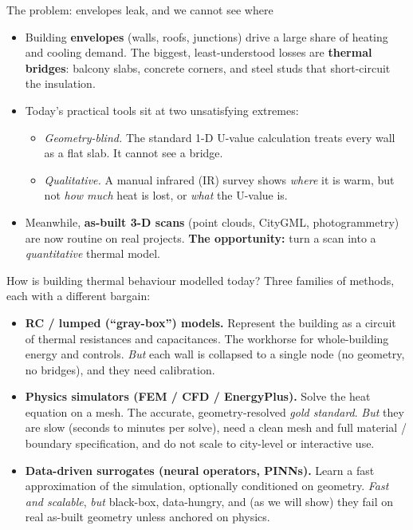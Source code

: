 \documentclass[aspectratio=169]{beamer}
\newcommand{\bad}[1]{{\color{red!65!black}#1}}
\begin{document}
\begin{frame}{The problem: envelopes leak, and we cannot see where}
  \begin{itemize}
    \item Building \textbf{envelopes} (walls, roofs, junctions) drive a large share of heating and
          cooling demand. The biggest, least-understood losses are \textbf{thermal bridges}:
          balcony slabs, concrete corners, and steel studs that short-circuit the insulation.
    \item Today's practical tools sit at two unsatisfying extremes:
      \begin{itemize}
        \item \emph{Geometry-blind.} The standard 1-D U-value calculation treats every wall as a
              flat slab. It cannot see a bridge.
        \item \emph{Qualitative.} A manual infrared (IR) survey shows \emph{where} it is warm, but
              not \emph{how much} heat is lost, or \emph{what} the U-value is.
      \end{itemize}
    \item Meanwhile, \textbf{as-built 3-D scans} (point clouds, CityGML, photogrammetry) are now
          routine on real projects. \textbf{The opportunity:} turn a scan into a \emph{quantitative}
          thermal model.
  \end{itemize}
\end{frame}

\begin{frame}{How is building thermal behaviour modelled today?}
  Three families of methods, each with a different bargain:
  \begin{itemize}
    \item \textbf{RC / lumped (``gray-box'') models.} Represent the building as a circuit of thermal
          resistances and capacitances. The workhorse for whole-building energy and controls.
          \emph{But} each wall is collapsed to a single node (\bad{no geometry, no bridges}), and
          they need calibration.
    \item \textbf{Physics simulators (FEM / CFD / EnergyPlus).} Solve the heat equation on a mesh.
          The accurate, geometry-resolved \emph{gold standard}. \emph{But} they are \bad{slow}
          (seconds to minutes per solve), need a clean mesh and full material / boundary
          specification, and do not scale to city-level or interactive use.
    \item \textbf{Data-driven surrogates (neural operators, PINNs).} Learn a fast approximation of the
          simulation, optionally conditioned on geometry. \emph{Fast and scalable}, \emph{but}
          \bad{black-box}, data-hungry, and (as we will show) they \bad{fail on real as-built
          geometry} unless anchored on physics.
  \end{itemize}
\end{frame}
\end{document}

